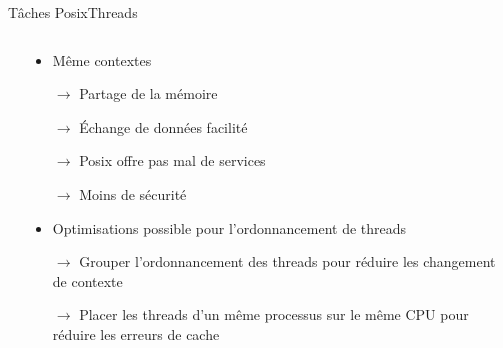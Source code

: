 \begin{frame}{Tâches Posix}{Threads}
  \begin{columns}
    \begin{column}{3.5cm}
    \end{column}
    \begin{column}{6.5cm}
      \begin{itemize}
      \item Même contextes
      \item[$\to$] Partage de la mémoire
        \item[$\to$] Échange de données facilité
        \item[$\to$] Posix offre pas mal de services   
        \item[$\to$] Moins de sécurité   
        \item Optimisations possible pour l'ordonnancement de threads
        \item[$\to$] Grouper l'ordonnancement des threads pour réduire
          les changement de contexte
        \item[$\to$]  Placer les  threads d'un  même processus  sur le
          même CPU pour réduire les erreurs de cache
      \end{itemize}
    \end{column}
  \end{columns}
\end{frame}

